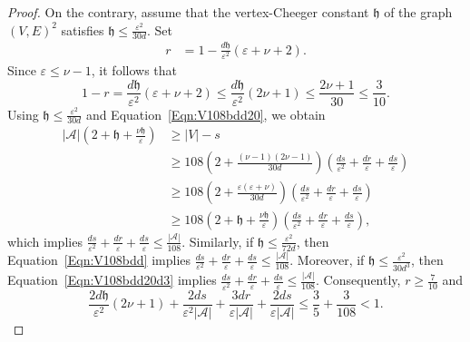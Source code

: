 \documentclass[10pt]{article}
\theoremstyle{definition}
\newcommand{\scrA}{\ensuremath{\mathscr{A}}}
\newcommand{\tth}{\ensuremath{\mathfrak{h}}}
\begin{document}
\begin{proof}
On the contrary, assume that the vertex-Cheeger constant $\tth$ of the graph $(V, E)^2$ satisfies $\tth \leq  \frac{\varepsilon^{2}}{30d}$. 
Set 
\begin{align*}
r & =  1- \frac {d \tth}{ \varepsilon^2}  ( \varepsilon + \nu + 2).
\end{align*}
Since $\varepsilon \leq \nu -1$, it follows that 
$$
1 - r = \frac {d \tth}{ \varepsilon^2}  ( \varepsilon + \nu + 2)
\leq \frac {d \tth}{ \varepsilon^2}  (2\nu+1) 
\leq \frac{2\nu +1}{30}
\leq \frac 3{10}.$$
Using $\tth \leq  \frac{\varepsilon^{2}}{30d}$ and Equation~\eqref{Eqn:V108bdd20}, we obtain 
\begin{align*}
|\scrA| \left( 2 + \tth + \frac {\nu \tth} {\varepsilon} \right) 
& \geq 
|V| - s\\
& \geq 
108 \left( 2 + \frac {(\nu-1)(2\nu -1)} {30d}  \right)  
\left( \frac{ds}{\varepsilon^2} + \frac{dr}\varepsilon + \frac{ds}{\varepsilon}\right) \\
& \geq 
108 \left( 2 + \frac {\varepsilon (\varepsilon  + \nu)} {30d}  \right)  
\left( \frac{ds}{\varepsilon^2} + \frac{dr}\varepsilon + \frac{ds}{\varepsilon}\right) \\
& \geq 
108 \left( 2 + \tth + \frac {\nu\tth} {\varepsilon} \right)  
\left( \frac{ds}{\varepsilon^2} + \frac{dr}\varepsilon + \frac{ds}{\varepsilon}\right) ,
\end{align*}
which implies 
$ \frac{ ds}{\varepsilon^2 }
+ \frac{ dr}{\varepsilon } + \frac{ds}{\varepsilon}\leq \frac{|\scrA|}{108}$. 
Similarly, if $\tth \leq  \frac{\varepsilon^{2}}{72d}$, then Equation~\eqref{Eqn:V108bdd} implies 
$ \frac{ ds}{\varepsilon^2 }
+ \frac{ dr}{\varepsilon } + \frac{ds}{\varepsilon} \leq \frac{|\scrA|}{108}$. 
Moreover, if $\tth \leq  \frac{\varepsilon^{2}}{30d^3}$, then Equation~\eqref{Eqn:V108bdd20d3} implies 
$ \frac{ ds}{\varepsilon^2 }
+ \frac{ dr}{\varepsilon } + \frac{ds}{\varepsilon}\leq \frac{|\scrA|}{108}$. Consequently, $r\geq \frac 7{10}$ and 
$$
\frac {2d\tth} { \varepsilon^2} ( 2\nu + 1) 
+ \frac{2d s}{\varepsilon^2 |\scrA|}
+ \frac{3dr}{\varepsilon |\scrA|}
+ \frac{2ds}{\varepsilon |\scrA|}
\leq 
\frac 3{5} + \frac 3 {108} 
< 1.
$$
 

\end{proof}
\end{document}
